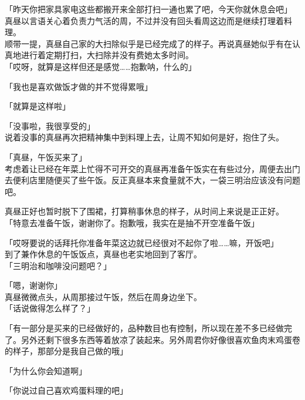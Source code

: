 「昨天你把家具家电这些都搬开来全部打扫一通也累了吧，今天你就休息会吧」\\

真昼以言语关心着负责力气活的周，不过并没有回头看周这边而是继续打理着料理。\\

顺带一提，真昼自己家的大扫除似乎是已经完成了的样子。再说真昼她似乎有在认真地进行着定期打扫，大扫除并没有费她太多时间。\\

「哎呀，就算是这样但还是感觉……抱歉呐，什么的」

「我也是喜欢做饭才做的并不觉得累哦」

「就算是这样啦」

「没事啦，我很享受的」\\

说着没事的真昼再次把精神集中到料理上去，让周不知如何是好，抱住了头。\\

\vspace{2\baselineskip}

「真昼，午饭买来了」\\

考虑着让已经在年菜上忙得不可开交的真昼再准备午饭实在有些过分，周便去出门去便利店里随便买了些午饭。反正真昼本来食量就不大，一袋三明治应该没有问题吧。

真昼正好也暂时脱下了围裙，打算稍事休息的样子，从时间上来说是正正好。\\

「特意去准备午饭，谢谢你了。抱歉哦，我实在是抽不开空准备午饭」

「哎呀要说的话拜托你准备年菜这边就已经很对不起你了啦……嘛，开饭吧」\\

到了兼作休息的午饭饭点，真昼也老实地回到了客厅。\\

「三明治和咖啡没问题吧？」

「嗯，谢谢你」\\

真昼微微点头，从周那接过午饭，然后在周身边坐下。\\

「话说做得怎么样了？」

「有一部分是买来的已经做好的，品种数目也有控制，所以现在差不多已经做完了。另外还剩下很多东西等着放凉了装起来。另外周君你好像很喜欢鱼肉末鸡蛋卷的样子，那部分是我自己做的哦」

「为什么你会知道啊」

「你说过自己喜欢鸡蛋料理的吧」\\

